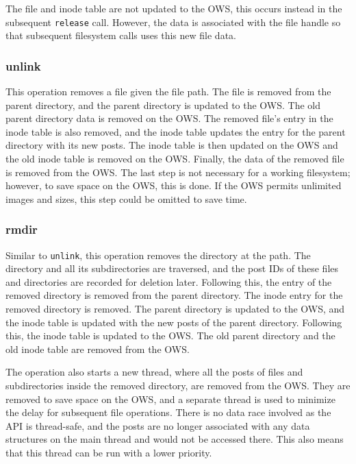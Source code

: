 The file and inode table are not updated to the \gls{OWS}, this occurs instead in the subsequent \texttt{release} call. However, the data is associated with the file handle so that subsequent filesystem calls uses this new file data.

\subsubsection{unlink}
This operation removes a file given the file path. The file is removed from the parent directory, and the parent directory is updated to the \gls{OWS}. The old parent directory data is removed on the \gls{OWS}. The removed file's entry in the inode table is also removed, and the inode table updates the entry for the parent directory with its new posts. The inode table is then updated on the \gls{OWS} and the old inode table is removed on the \gls{OWS}. Finally, the data of the removed file is removed from the \gls{OWS}. The last step is not necessary for a working filesystem; however, to save space on the \gls{OWS}, this is done. If the \gls{OWS} permits unlimited images and sizes, this step could be omitted to save time.

\subsubsection{rmdir}
Similar to \texttt{unlink}, this operation removes the directory at the path. The directory and all its subdirectories are traversed, and the post IDs of these files and directories are recorded for deletion later. Following this, the entry of the removed directory is removed from the parent directory. The inode entry for the removed directory is removed. The parent directory is updated to the \gls{OWS}, and the inode table is updated with the new posts of the parent directory. Following this, the inode table is updated to the \gls{OWS}. The old parent directory and the old inode table are removed from the \gls{OWS}.

The operation also starts a new thread, where all the posts of files and subdirectories inside the removed directory, are removed from the \gls{OWS}. They are removed to save space on the \gls{OWS}, and a separate thread is used to minimize the delay for subsequent file operations. There is no data race involved as the \gls{API} is \mbox{thread-safe}, and the posts are no longer associated with any data structures on the main thread and would not be accessed there. This also means that this thread can be run with a lower priority.

